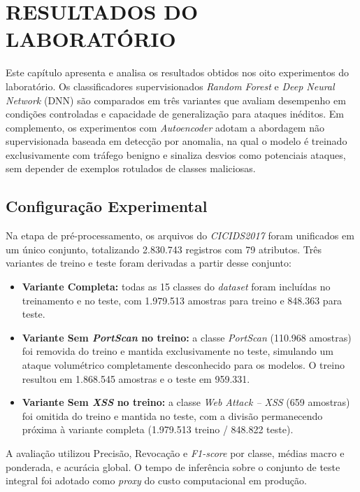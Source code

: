 \chapter{RESULTADOS DO LABORATÓRIO}

Este capítulo apresenta e analisa os resultados obtidos nos oito experimentos do laboratório. Os classificadores supervisionados \textit{Random Forest} e \textit{Deep Neural Network} (DNN) são comparados em três variantes que avaliam desempenho em condições controladas e capacidade de generalização para ataques inéditos. Em complemento, os experimentos com \textit{Autoencoder} adotam a abordagem não supervisionada baseada em detecção por anomalia, na qual o modelo é treinado exclusivamente com tráfego benigno e sinaliza desvios como potenciais ataques, sem depender de exemplos rotulados de classes maliciosas.

\section{Configuração Experimental}

Na etapa de pré-processamento, os arquivos do \textit{CICIDS2017} foram unificados em um único conjunto, totalizando 2.830.743 registros com 79 atributos. Três variantes de treino e teste foram derivadas a partir desse conjunto:

\begin{itemize}
    \item \textbf{Variante Completa:} todas as 15 classes do \textit{dataset} foram incluídas no treinamento e no teste, com 1.979.513 amostras para treino e 848.363 para teste.
    \item \textbf{Variante Sem \textit{PortScan} no treino:} a classe \textit{PortScan} (110.968 amostras) foi removida do treino e mantida exclusivamente no teste, simulando um ataque volumétrico completamente desconhecido para os modelos. O treino resultou em 1.868.545 amostras e o teste em 959.331.
    \item \textbf{Variante Sem \textit{XSS} no treino:} a classe \textit{Web Attack -- XSS} (659 amostras) foi omitida do treino e mantida no teste, com a divisão permanecendo próxima à variante completa (1.979.513 treino / 848.822 teste).
\end{itemize}

A avaliação utilizou Precisão, Revocação e \textit{F1-score} por classe, médias macro e ponderada, e acurácia global. O tempo de inferência sobre o conjunto de teste integral foi adotado como \textit{proxy} do custo computacional em produção.

